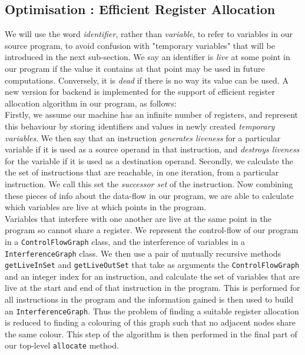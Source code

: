 \documentclass[a4paper]{article}
\theoremstyle{definition}
\begin{document}
\subsection{Optimisation : Efficient Register Allocation}
We will use the word \textit{identifier}, rather than \textit{variable}, to refer to variables in our source program, to avoid confusion with "temporary variables" that will be introduced in the next sub-section. We say an identifier is \textit{live} at some point in our program if the value it contains at that point may be used in future computations. Conversely, it is \textit{dead} if there is no way its value can be used. A new version for backend is implemented for the support of efficient register allocation algorithm in our program, as follows:\\
\phantom{3ex} Firstly, we assume our machine has an infinite number of registers, and represent this behaviour by storing identifiers and values in newly created \textit{temporary variables}. We then say that an instruction \textit{generates liveness} for a particular variable if it is used as a source operand in that instruction, and \textit{destroys liveness} for the variable if it is used as a destination operand. Secondly, we calculate the the set of instructions that are reachable, in one iteration, from a particular instruction. We call this set the \textit{successor set} of the instruction. Now combining these pieces of info about the data-flow in our program, we are able to calculate which variables are live at which points in the program.\\
\phantom{3ex}
Variables that interfere with one another are live at the same point in the program so cannot share a register. We represent the control-flow of our program in a \texttt{ControlFlowGraph} class, and the interference of variables in a \texttt{InterferenceGraph} class. We then use a pair of mutually recursive methods \texttt{getLiveInSet} and \texttt{getLiveOutSet} that take as arguments the \texttt{ControlFlowGraph} and an integer index for an instruction, and calculate the set of variables that are live at the start and end of that instruction in the program. This is performed for all instructions in the program and the information gained is then used to build an \texttt{InterferenceGraph}. Thus the problem of finding a suitable register allocation is reduced to finding a colouring of this graph such that no adjacent nodes share the same colour. This step of the algorithm is then performed in the final part of our top-level \texttt{allocate} method.

\end{document}
